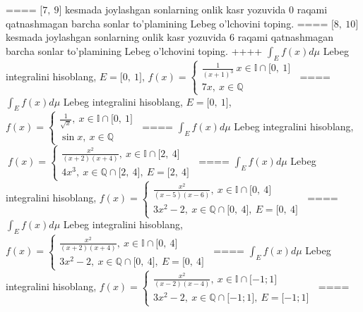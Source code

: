 ====
\(\lbrack 7,\ 9\rbrack\) kesmada joylashgan sonlarning onlik kasr yozuvida \(0\) raqami qatnashmagan barcha sonlar to'plamining Lebeg o'lchovini toping.
====
\(\lbrack 8,\ 10\rbrack\) kesmada joylashgan sonlarning onlik kasr yozuvida \(6\) raqami qatnashmagan barcha sonlar to'plamining Lebeg o'lchovini toping.
++++
\(\int_{E}^{}f(x)d\mu\) Lebeg integralini hisoblang, \(E = \lbrack 0,\ 1\rbrack\), \(f(x) = \left\{ \begin{matrix}
\frac{1}{(x + 1)^{3}}\ x \in \mathbb{I} \cap \lbrack 0,\ 1\rbrack \\
7x,\ x\mathbb{\in Q}
\end{matrix} \right.\ \)
====
\(\int_{E}^{}f(x)d\mu\) Lebeg integralini hisoblang, \(E = \lbrack 0,\ 1\rbrack\), \(f(x) = \left\{ \begin{matrix}
\frac{1}{\sqrt{x}},\ x \in \mathbb{I} \cap \lbrack 0,\ 1\rbrack \\
\sin x,\ x\mathbb{\in Q}
\end{matrix} \right.\ \)
====
\(\int_{E}^{}f(x)d\mu\) Lebeg integralini hisoblang,\(\ f(x) = \left\{ \begin{matrix}
\frac{x^{2}}{(x + 2)(x + 4)},\ x \in \mathbb{I} \cap \lbrack 2,\ 4\rbrack \\
4x^{3},\ x\mathbb{\in Q \cap}\lbrack 2,\ 4\rbrack,\ E = \lbrack 2,\ 4\rbrack
\end{matrix} \right.\ \)
====
\(\int_{E}^{}f(x)d\mu\) Lebeg integralini hisoblang, \(f(x) = \left\{ \begin{matrix}
\frac{x^{2}}{(x - 5)(x - 6)},\ x \in \mathbb{I} \cap \lbrack 0,\ 4\rbrack \\
3x^{2} - 2,\ x\mathbb{\in Q \cap}\lbrack 0,\ 4\rbrack,\ E = \lbrack 0,\ 4\rbrack
\end{matrix} \right.\ \)
====
\(\int_{E}^{}f(x)d\mu\) Lebeg integralini hisoblang, \(f(x) = \left\{ \begin{matrix}
\frac{x^{2}}{(x + 2)(x + 4)},\ x \in \mathbb{I} \cap \lbrack 0,\ 4\rbrack \\
3x^{2} - 2,\ x\mathbb{\in Q \cap}\lbrack 0,\ 4\rbrack,\ E = \lbrack 0,\ 4\rbrack
\end{matrix} \right.\ \)
====
\(\int_{E}^{}f(x)d\mu\) Lebeg integralini hisoblang, \(f(x) = \left\{ \begin{matrix}
\frac{x^{2}}{(x - 2)(x - 4)},\ x \in \mathbb{I} \cap \lbrack - 1;1\rbrack \\
3x^{2} - 2,\ x\mathbb{\in Q \cap}\lbrack - 1;1\rbrack,\ E = \lbrack - 1;1\rbrack
\end{matrix} \right.\ \)
====
